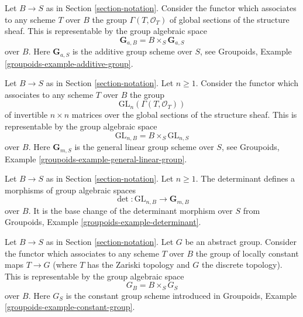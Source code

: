 \begin{example}
\label{example-additive-group}
Let $B \to S$ as in Section \ref{section-notation}.
Consider the functor which associates
to any scheme $T$ over $B$ the group $\Gamma(T, \mathcal{O}_T)$
of global sections of the structure sheaf.
This is representable by the group algebraic space
$$
\mathbf{G}_{a, B} = B \times_S \mathbf{G}_{a, S}
$$
over $B$. Here $\mathbf{G}_{a, S}$ is the additive group scheme
over $S$, see
Groupoids, Example \ref{groupoids-example-additive-group}.
\end{example}

\begin{example}
\label{example-general-linear-group}
Let $B \to S$ as in Section \ref{section-notation}.
Let $n \geq 1$.
Consider the functor which associates
to any scheme $T$ over $B$ the group
$$
\text{GL}_n(\Gamma(T, \mathcal{O}_T))
$$
of invertible $n \times n$ matrices over
the global sections of the structure sheaf.
This is representable by the group algebraic space
$$
\text{GL}_{n, B} = B \times_S \text{GL}_{n, S}
$$
over $B$. Here $\mathbf{G}_{m, S}$ is the general linear group scheme
over $S$, see
Groupoids, Example \ref{groupoids-example-general-linear-group}.
\end{example}

\begin{example}
\label{example-determinant}
Let $B \to S$ as in Section \ref{section-notation}.
Let $n \geq 1$.
The determinant defines a morphisms of group algebraic spaces
$$
\det : \text{GL}_{n, B} \longrightarrow \mathbf{G}_{m, B}
$$
over $B$. It is the base change of the determinant morphism
over $S$ from
Groupoids, Example \ref{groupoids-example-determinant}.
\end{example}

\begin{example}
\label{example-constant-group}
Let $B \to S$ as in Section \ref{section-notation}.
Let $G$ be an abstract group. Consider the functor
which associates to any scheme $T$ over $B$ the group
of locally constant maps $T \to G$ (where $T$ has the Zariski topology
and $G$ the discrete topology). This is representable by the
group algebraic space
$$
G_B = B \times_S G_S
$$
over $B$. Here $G_S$ is the constant group scheme introduced in
Groupoids, Example \ref{groupoids-example-constant-group}.
\end{example}





